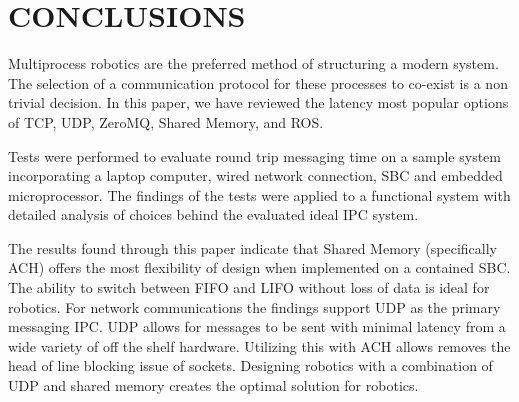 \section{CONCLUSIONS}

Multiprocess robotics are the preferred method of structuring a modern system. The selection of a communication protocol for these processes to co-exist is a non trivial decision. In this paper, we have reviewed the latency most popular options of TCP, UDP, ZeroMQ, Shared Memory, and ROS.

Tests were performed to evaluate round trip messaging time on a sample system incorporating a laptop computer, wired network connection, SBC and embedded microprocessor. The findings of the tests were applied to a functional system with detailed analysis of choices behind the evaluated ideal IPC system.

The results found through this paper indicate that Shared Memory (specifically ACH) offers the most flexibility of design when implemented on a contained SBC. The ability to switch between FIFO and LIFO without loss of data is ideal for robotics. For network communications the findings support UDP as the primary messaging IPC. UDP allows for messages to be sent with minimal latency from a wide variety of off the shelf hardware. Utilizing this with ACH allows removes the head of line blocking issue of sockets. Designing robotics with a combination of UDP and shared memory creates the optimal solution for robotics.
